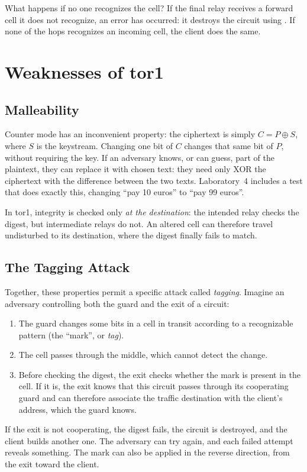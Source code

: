 What happens if no one recognizes the cell? If the final relay receives a forward cell it does not recognize, an error has occurred: it destroys the circuit using . If none of the hops recognizes an incoming cell, the client does the same.

\section{Weaknesses of tor1}\label{sec:tor1-debolezze}

\subsection{Malleability}

Counter mode has an inconvenient property: the ciphertext is simply $C = P \oplus S$, where $S$ is the keystream. Changing one bit of $C$ changes that same bit of $P$, without requiring the key. If an adversary knows, or can guess, part of the plaintext, they can replace it with chosen text: they need only XOR the ciphertext with the difference between the two texts. Laboratory~4 includes a test that does exactly this, changing \enquote{pay 10 euros} to \enquote{pay 99 euros}.

In tor1, integrity is checked only \emph{at the destination}: the intended relay checks the digest, but intermediate relays do not. An altered cell can therefore travel undisturbed to its destination, where the digest finally fails to match.

\subsection{The Tagging Attack}

Together, these properties permit a specific attack called \emph{tagging}. Imagine an adversary controlling both the guard and the exit of a circuit:
\begin{enumerate}
  \item The guard changes some bits in a cell in transit according to a recognizable pattern (the \enquote{mark}, or \emph{tag}).
  \item The cell passes through the middle, which cannot detect the change.
  \item Before checking the digest, the exit checks whether the mark is present in the cell. If it is, the exit knows that this circuit passes through its cooperating guard and can therefore associate the traffic destination with the client's address, which the guard knows.
\end{enumerate}
If the exit is not cooperating, the digest fails, the circuit is destroyed, and the client builds another one. The adversary can try again, and each failed attempt reveals something. The mark can also be applied in the reverse direction, from the exit toward the client.

